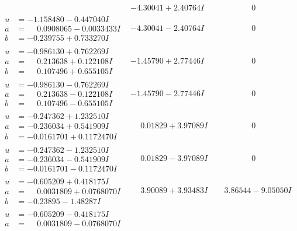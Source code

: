 \documentclass[1p]{elsarticle_modified}
\theoremstyle{definition}
\begin{document}
$$\begin{array}{c|c|c}
 & -4.30041 + 2.40764 I & \phantom{-0.000000 } 0 \\ \hline\begin{aligned}
u &= -1.158480 - 0.447040 I \\
a &= \phantom{-}0.0908065 - 0.0033433 I \\
b &= -0.239755 + 0.733270 I\end{aligned}
 & -4.30041 - 2.40764 I & \phantom{-0.000000 } 0 \\ \hline\begin{aligned}
u &= -0.986130 + 0.762269 I \\
a &= \phantom{-}0.213638 + 0.122108 I \\
b &= \phantom{-}0.107496 + 0.655105 I\end{aligned}
 & -1.45790 + 2.77446 I & \phantom{-0.000000 } 0 \\ \hline\begin{aligned}
u &= -0.986130 - 0.762269 I \\
a &= \phantom{-}0.213638 - 0.122108 I \\
b &= \phantom{-}0.107496 - 0.655105 I\end{aligned}
 & -1.45790 - 2.77446 I & \phantom{-0.000000 } 0 \\ \hline\begin{aligned}
u &= -0.247362 + 1.232510 I \\
a &= -0.236034 + 0.541909 I \\
b &= -0.0161701 + 0.1172470 I\end{aligned}
 & \phantom{-}0.01829 + 3.97089 I & \phantom{-0.000000 } 0 \\ \hline\begin{aligned}
u &= -0.247362 - 1.232510 I \\
a &= -0.236034 - 0.541909 I \\
b &= -0.0161701 - 0.1172470 I\end{aligned}
 & \phantom{-}0.01829 - 3.97089 I & \phantom{-0.000000 } 0 \\ \hline\begin{aligned}
u &= -0.605209 + 0.418175 I \\
a &= \phantom{-}0.0031809 + 0.0768070 I \\
b &= -0.23895 - 1.48287 I\end{aligned}
 & \phantom{-}3.90089 + 3.93483 I & \phantom{-}3.86544 - 9.05050 I \\ \hline\begin{aligned}
u &= -0.605209 - 0.418175 I \\
a &= \phantom{-}0.0031809 - 0.0768070 I \\

\end{aligned}
\end{array}$$
\end{document}
